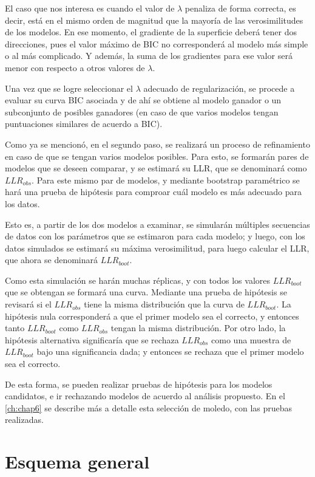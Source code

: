 El caso que nos interesa es cuando el valor de $\lambda$ penaliza de forma correcta, es decir, está en el mismo orden de magnitud que la mayoría de las verosimilitudes de los modelos. En ese momento, el gradiente de la superficie deberá tener dos direcciones, pues el valor máximo de \ac{BIC} no corresponderá al modelo más simple o al más complicado. Y además, la suma de los gradientes para ese valor será menor con respecto a otros valores de $\lambda$. 

Una vez que se logre seleccionar el $\lambda$ adecuado de regularización, se procede a evaluar su curva \ac{BIC} asociada y de ahí se obtiene al modelo ganador o un subconjunto de posibles ganadores (en caso de que varios modelos tengan puntuaciones similares de acuerdo a \ac{BIC}).

Como ya se mencionó, en el segundo paso, se realizará un proceso de refinamiento en caso de que se tengan varios modelos posibles. Para esto, se formarán pares de modelos que se deseen comparar, y se estimará su \ac{LLR}, que se denominará como $LLR_{obs}$. Para este mismo par de modelos, y mediante bootstrap paramétrico se hará una prueba de hipótesis para comproar cuál modelo es más adecuado para los datos.

Esto es, a partir de los dos modelos a examinar, se simularán múltiples secuencias de datos con los parámetros que se estimaron para cada modelo; y luego, con los datos simulados se estimará su máxima verosimilitud, para luego calcular el \ac{LLR}, que ahora se denominará $LLR_{boot}$. 

Como esta simulación se harán muchas réplicas, y con todos los valores $LLR_{boot}$ que se obtengan se formará una curva. Mediante una prueba de hipótesis se revisará si el $LLR_{obs}$ tiene la misma distribución que la curva de $LLR_{boot}$. La hipótesis nula corresponderá a que el primer modelo sea el correcto, y entonces tanto $LLR_{boot}$ como $LLR_{obs}$ tengan la misma distribución. Por otro lado, la hipótesis alternativa significaría que se rechaza $LLR_{obs}$ como una muestra de $LLR_{boot}$ bajo una significancia dada; y entonces se rechaza que el primer modelo sea el correcto.

De esta forma, se pueden realizar pruebas de hipótesis para los modelos candidatos, e ir rechazando modelos de acuerdo al análisis propuesto. En el \autoref{ch:chap6} se describe más a detalle esta selección de moledo, con las pruebas realizadas.

\section{Esquema general} 

